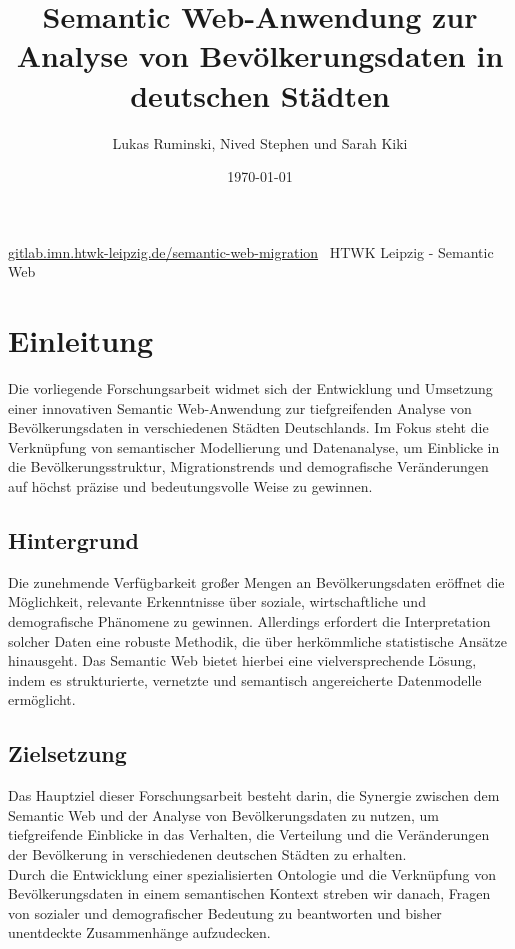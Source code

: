 \documentclass[a4paper, 12pt]{article}
\title{Semantic Web-Anwendung zur Analyse von Bevölkerungsdaten in deutschen Städten}
\author{Lukas Ruminski, Nived Stephen und Sarah Kiki}
\date{\today}
\begin{document}
\begin{titlepage}
    \maketitle
    \begin{center}
        \Large\href{https://gitlab.imn.htwk-leipzig.de/semantic-web-migration/migration-backend}{gitlab.imn.htwk-leipzig.de/semantic-web-migration}
        \vfill
        \Large\ HTWK Leipzig - Semantic Web
    \end{center}
\end{titlepage}

\begin{titlepage}
    \tableofcontents %
\end{titlepage}

\section{Einleitung}
Die vorliegende Forschungsarbeit widmet sich der Entwicklung und Umsetzung einer innovativen Semantic Web-Anwendung zur tiefgreifenden Analyse von Bevölkerungsdaten in verschiedenen Städten Deutschlands. Im Fokus steht die Verknüpfung von semantischer Modellierung und Datenanalyse, um Einblicke in die Bevölkerungsstruktur, Migrationstrends und demografische Veränderungen auf höchst präzise und bedeutungsvolle Weise zu gewinnen.

\subsection{Hintergrund}
Die zunehmende Verfügbarkeit großer Mengen an Bevölkerungsdaten eröffnet die Möglichkeit, relevante Erkenntnisse über soziale, wirtschaftliche und demografische Phänomene zu gewinnen. Allerdings erfordert die Interpretation solcher Daten eine robuste Methodik, die über herkömmliche statistische Ansätze hinausgeht. Das Semantic Web bietet hierbei eine vielversprechende Lösung, indem es strukturierte, vernetzte und semantisch angereicherte Datenmodelle ermöglicht.

\subsection{Zielsetzung}
Das Hauptziel dieser Forschungsarbeit besteht darin, die Synergie zwischen dem Semantic Web und der Analyse von Bevölkerungsdaten zu nutzen, um tiefgreifende Einblicke in das Verhalten, die Verteilung und die Veränderungen der Bevölkerung in verschiedenen deutschen Städten zu erhalten.\\
Durch die Entwicklung einer spezialisierten Ontologie und die Verknüpfung von Bevölkerungsdaten in einem semantischen Kontext streben wir danach, Fragen von sozialer und demografischer Bedeutung zu beantworten und bisher unentdeckte Zusammenhänge aufzudecken.
\end{document}
